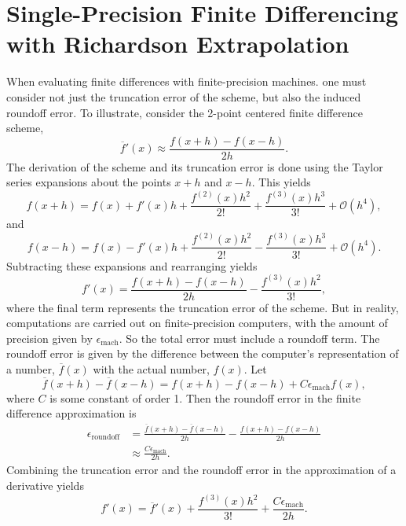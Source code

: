 \documentclass[11pt]{article}
\begin{document}
\section{Single-Precision Finite Differencing with Richardson Extrapolation}
When evaluating finite differences with finite-precision machines. one must consider not just the truncation error of the scheme,
but also the induced roundoff error. To illustrate, consider the 2-point centered finite difference scheme,
\begin{equation}
\overline{f}'(x) \approx \frac{f(x+h) - f(x-h)}{2h}.
\end{equation}
The derivation of the scheme and its truncation error is done using the Taylor series expansions about the points
 $x+h$ and $x-h$. This yields
\begin{equation}
f(x+h) = f(x) + f'(x) h + \frac{f^{(2)}(x) h^2}{2!} + \frac{f^{(3)}(x) h^3}{3!} + \mathcal{O}(h^4),
\end{equation}
and
\begin{equation}
f(x-h) = f(x) - f'(x) h + \frac{f^{(2)}(x) h^2}{2!} - \frac{f^{(3)}(x) h^3}{3!} + \mathcal{O}(h^4).
\end{equation}
Subtracting these expansions and rearranging yields
\begin{equation}
f'(x) = \frac{ f(x+h) - f(x-h) } { 2 h } - \frac{f^{(3)}(x) h^2}{3!},
\end{equation}
where the final term represents the truncation error of the scheme. But in reality, computations are carried out on
finite-precision computers, with the amount of precision given by $\epsilon_{\text{mach}}$. So the total error must 
include a roundoff term. The roundoff error is given by the difference
between the computer's representation of a number, $\overline{f}(x)$ with the actual number, $f(x)$. Let
\begin{equation}
\overline{f}(x+h) - \overline{f}(x-h) =  f(x+h) - f(x-h) + C \epsilon_{\text{mach}} f(x),
\end{equation}
where $C$ is some constant of order 1. Then the roundoff error in the finite difference approximation is
\begin{align*}
\epsilon_{\text{roundoff}} &= \frac{ \overline{f}(x+h) - \overline{f}(x-h) } { 2 h } - \frac{ f(x+h) - f(x-h) } { 2 h } \\
& \approx \frac{ C \epsilon_{\text{mach}} } {2 h }.
\end{align*}
Combining the truncation error and the roundoff error in the approximation of a derivative yields
\begin{equation}
f'(x) = \overline{f}'(x) + \frac{f^{(3)}(x) h^2}{3!} + \frac{ C \epsilon_{\text{mach}} } {2 h }.
\label{error}
\end{equation}
\end{document}
